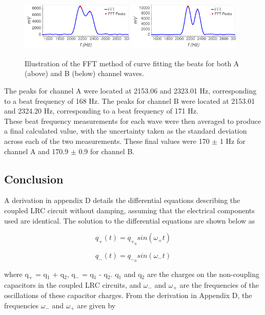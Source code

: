 \documentclass[aps,prl,reprint]{revtex4-2}
\begin{document}
\begin{figure}[h]
\includegraphics[width=0.48\textwidth]{../Images/l6_channel_A_fft.png}
\includegraphics[width=0.48\textwidth]{../Images/l6_channel_B_fft.png}
\caption{\label{peaks} Illustration of the FFT method of curve fitting 
the beats for both A (above) and B (below) channel waves.}
\end{figure}

The peaks for channel A were located at 2153.06 and 2323.01 Hz, corresponding
to a beat frequency of 168 Hz. 
The peaks for channel B were located at 2153.01 and 2324.20 Hz, corresponding
to a beat frequency of 171 Hz. \\

These beat frequency measurements for each wave were then averaged
to produce a final calculated value, with the uncertainty taken as
the standard deviation across each of the two measurements. These
final values were 170 $\pm$ 1 Hz for channel A and 170.9 $\pm$ 0.9
for channel B. 

\subsection{Conclusion}

A derivation in appendix D details the differential equations describing 
the coupled LRC circuit without damping, assuming that the electrical
components used are identical.
The solution to the differential equations are shown below as

\begin{equation} 
q_+(t) = q_{+_0}sin(\omega_{+}t)
\label{qplus}
\end{equation}

\begin{equation} 
q_-(t) = q_{-_0}sin(\omega_{-}t)
\label{qplus}
\end{equation}

where q$_+$ = q$_1$ + q$_2$, q$_-$ = q$_1$ - q$_2$. q$_1$ and q$_2$ are 
the charges on the non-coupling capacitors in the coupled LRC circuits, and 
$\omega_-$ and $\omega_+$ are the frequencies of the oscillations of these
capacitor charges. From the derivation in Appendix D, the frequencies 
$\omega_-$ and $\omega_+$ are given by 
\end{document}
